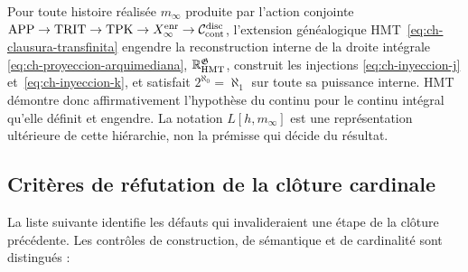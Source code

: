 \begin{theorem}
\label{thm:decision-continuo-hmt}
Pour toute histoire réalisée
\(m_\infty\) produite par l’action conjointe
\(\mathrm{APP}\to\mathrm{TRIT}\to\mathrm{TPK}\to
X_\infty^{\rm enr}\to\mathcal C_{\rm cont}^{\rm disc}\), l’extension
généalogique HMT~\eqref{eq:ch-clausura-transfinita} engendre la reconstruction interne de la droite intégrale
\eqref{eq:ch-proyeccion-arquimediana}, \(\mathbb R_{\rm HMT}^{\mathfrak G}\), construit les injections
\eqref{eq:ch-inyeccion-j} et~\eqref{eq:ch-inyeccion-k}, et satisfait
\(2^{\aleph_0}=\aleph_1\) sur toute sa puissance interne. HMT
démontre donc affirmativement l’hypothèse du continu pour le continu
intégral qu’elle définit et engendre. La notation \(L[h,m_\infty]\) est une
représentation ultérieure de cette hiérarchie, non la prémisse qui décide du
résultat.
\end{theorem}


\subsection{Critères de réfutation de la clôture cardinale}

La liste suivante identifie les défauts qui invalideraient une étape de la clôture
précédente. Les contrôles de construction, de sémantique et de
cardinalité sont distingués :

